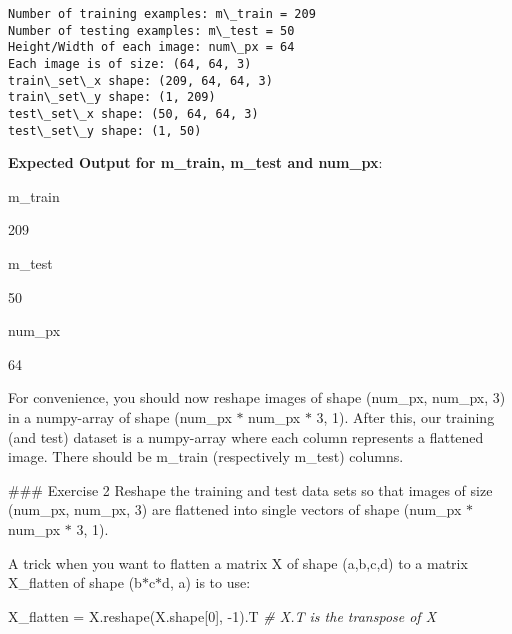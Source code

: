 \documentclass[11pt]{article}
\newenvironment{Shaded}{}{}
\newcommand{\DecValTok}[1]{\textcolor[rgb]{0.25,0.63,0.44}{{#1}}}
\newcommand{\CommentTok}[1]{\textcolor[rgb]{0.38,0.63,0.69}{\textit{{#1}}}}
\newcommand{\NormalTok}[1]{{#1}}
\newcommand{\OperatorTok}[1]{\textcolor[rgb]{0.40,0.40,0.40}{{#1}}}
\begin{document}
    \begin{Verbatim}[commandchars=\\\{\}]
Number of training examples: m\_train = 209
Number of testing examples: m\_test = 50
Height/Width of each image: num\_px = 64
Each image is of size: (64, 64, 3)
train\_set\_x shape: (209, 64, 64, 3)
train\_set\_y shape: (1, 209)
test\_set\_x shape: (50, 64, 64, 3)
test\_set\_y shape: (1, 50)
    \end{Verbatim}

    \textbf{Expected Output for m\_train, m\_test and num\_px}:

m\_train

209

m\_test

50

num\_px

64

    For convenience, you should now reshape images of shape (num\_px,
num\_px, 3) in a numpy-array of shape (num\_px \(*\) num\_px \(*\) 3,
1). After this, our training (and test) dataset is a numpy-array where
each column represents a flattened image. There should be m\_train
(respectively m\_test) columns.

\#\#\# Exercise 2 Reshape the training and test data sets so that images
of size (num\_px, num\_px, 3) are flattened into single vectors of shape
(num\_px \(*\) num\_px \(*\) 3, 1).

A trick when you want to flatten a matrix X of shape (a,b,c,d) to a
matrix X\_flatten of shape (b\(*\)c\(*\)d, a) is to use:

\begin{Shaded}
\begin{Highlighting}[]
\NormalTok{X\_flatten }\OperatorTok{=}\NormalTok{ X.reshape(X.shape[}\DecValTok{0}\NormalTok{], }\OperatorTok{{-}}\DecValTok{1}\NormalTok{).T      }\CommentTok{\# X.T is the transpose of X}
\end{Highlighting}
\end{Shaded}
\end{document}
